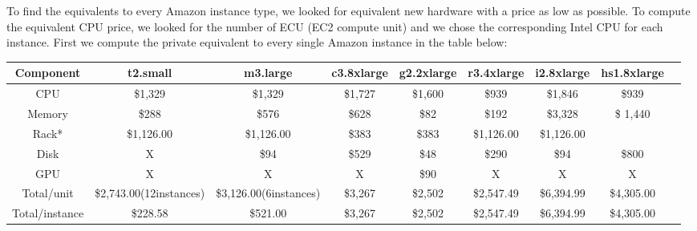 \documentclass[12pt,journal, a4paper]{IEEEtran}
\begin{document}
To find the equivalents to every Amazon instance type, we looked for equivalent new hardware with a price as low as possible. To compute the equivalent CPU price, we looked for the number of ECU (EC2 compute unit) and we chose the corresponding Intel CPU for each instance.
First we compute the private equivalent to every single Amazon instance in the table below:\\

\begin{table}[H]
\begin{center}

   \begin{tabular}{ | c | c | c | c | c | c | c | c | c |}

     \hline

     Component & t2.small & m3.large & c3.8xlarge & g2.2xlarge & r3.4xlarge & i2.8xlarge & hs1.8xlarge  \\ \hline \hline

     CPU & \$1,329 & \$1,329 & \$1,727 & \$1,600 & \$939 & \$1,846 & \$939 \\ \hline 

     Memory & \$288  & \$576 & \$628 &\$82 & \$192 & \$3,328 & \$ 1,440\\ \hline


     Rack*  & \$1,126.00 & \$1,126.00 & \$383 & \$383 & \$1,126.00 & \$1,126.00 &\\ \hline
     
     Disk & X & \$94 & \$529 & \$48 & \$290 & \$94 & \$800\\ \hline
     
     GPU & X & X & X & \$90 & X & X & X\\ \hline \hline

     Total/unit & \$2,743.00(12instances) & \$3,126.00(6instances) & \$3,267 & \$2,502 & \$2,547.49 & \$6,394.99 & \$4,305.00\\ \hline 
     
    Total/instance & \$228.58 & \$521.00 & \$3,267 & \$2,502 & \$2,547.49 & \$6,394.99 & \$4,305.00\\ \hline
        \end{tabular}
 \end{center} 
\end{table}
\end{document}
